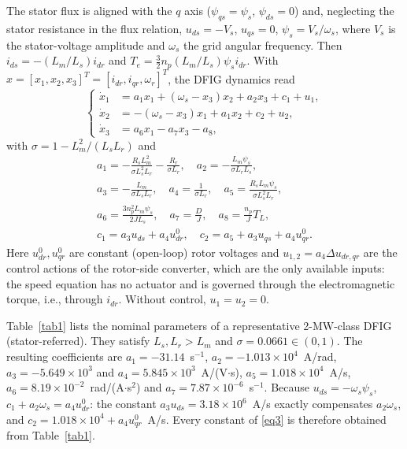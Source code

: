 \documentclass[conference]{IEEEtran}
\begin{document}
The stator flux is aligned with the $q$ axis ($\psi_{qs}=\psi_s$, $\psi_{ds}=0$) and, neglecting the stator resistance in the flux relation, $u_{ds}=-V_s$, $u_{qs}=0$, $\psi_s=V_s/\omega_s$, where $V_s$ is the stator-voltage amplitude and $\omega_s$ the grid angular frequency. Then $i_{ds}=-(L_m/L_s)i_{dr}$ and $T_e=\tfrac{3}{2}n_p(L_m/L_s)\psi_s i_{dr}$. With $x=[x_1,x_2,x_3]^T=[i_{dr},i_{qr},\omega_r]^T$, the DFIG dynamics \cite{r36} read
\begin{equation}
\left\{ \begin{aligned}
\dot{x}_{1} &= a_{1}x_{1} + ( \omega_{s} - x_{3})x_{2} + a_{2}x_{3} + c_1 + u_1, \\
\dot{x}_{2} &= - ( \omega_{s} - x_{3})x_{1} + a_{1}x_{2} + c_2 + u_2, \\
\dot{x}_{3} &= a_{6}x_{1} - a_{7}x_{3} - a_{8},
\end{aligned} \right.
\label{eq3}
\end{equation}
with $\sigma = 1-L_m^2/(L_sL_r)$ and
\begin{equation}
\begin{gathered}
a_{1} = - \frac{R_{s}L_{m}^{2}}{\sigma L_{s}^{2}L_{r}} - \frac{R_{r}}{\sigma L_{r}},\quad a_{2} = - \frac{L_{m}\psi_{s}}{\sigma L_{r}L_{s}},\\
a_{3} = - \frac{L_{m}}{\sigma L_{s}L_{r}},\quad a_{4} = \frac{1}{\sigma L_{r}},\quad a_{5} = \frac{R_{s}L_{m}\psi_{s}}{\sigma L_{s}^{2}L_{r}},\\
a_{6} = \frac{3n_{p}^{2}L_{m}\psi_{s}}{2JL_{s}},\quad a_{7} = \frac{D}{J},\quad a_{8} = \frac{n_{p}}{J}T_{L},\\
c_1 = a_3u_{ds}+a_4u_{dr}^0,\quad c_2 = a_5 + a_3u_{qs}+a_4u_{qr}^0 .
\end{gathered}
\label{eq4}
\end{equation}
Here $u_{dr}^0,u_{qr}^0$ are constant (open-loop) rotor voltages and $u_{1,2}=a_4\Delta u_{dr,qr}$ are the control actions of the rotor-side converter, which are the only available inputs: the speed equation has no actuator and is governed through the electromagnetic torque, i.e., through $i_{dr}$. Without control, $u_1=u_2=0$.

Table~\ref{tab1} lists the nominal parameters of a representative 2-MW-class DFIG (stator-referred). They satisfy $L_s,L_r>L_m$ and $\sigma=0.0661\in(0,1)$. The resulting coefficients are $a_1=-31.14$~s$^{-1}$, $a_2=-1.013\times10^{4}$~A/rad, $a_3=-5.649\times10^{3}$ and $a_4=5.845\times10^{3}$~A/(V$\cdot$s), $a_5=1.018\times10^{4}$~A/s, $a_6=8.19\times10^{-2}$~rad/(A$\cdot$s$^2$) and $a_7=7.87\times10^{-6}$~s$^{-1}$. Because $u_{ds}=-\omega_s\psi_s$, $c_1+a_2\omega_s=a_4u_{dr}^0$: the constant $a_3u_{ds}=3.18\times10^{6}$~A/s exactly compensates $a_2\omega_s$, and $c_2=1.018\times10^4+a_4u_{qr}^0$~A/s. Every constant of \eqref{eq3} is therefore obtained from Table~\ref{tab1}.
\end{document}
